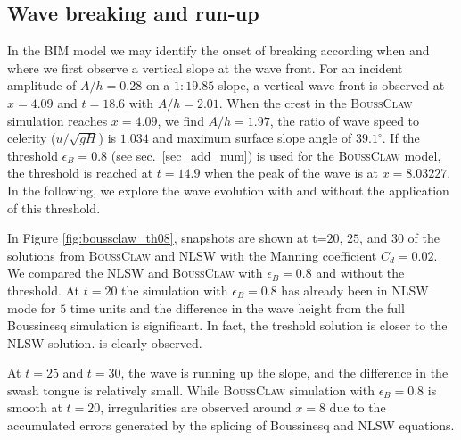 \documentclass[review]{elsarticle}
\newcommand{\BoussClaw}{\textsc{BoussClaw} }
\begin{document}
\subsection{Wave breaking and run-up}
In the BIM model we may identify the onset of breaking according when and where we first observe a vertical slope at the wave front.
For an incident amplitude of $A/h=0.28$ on a $1:19.85$ slope,
a vertical wave front is observed at $x=4.09$ and $t=18.6$ with $A/h=2.01$.
When the crest in the \BoussClaw simulation reaches $x=4.09$, 
we find
$A/h=1.97$, the ratio of wave speed to celerity ($u/\sqrt{gH}$)
is $1.034$ and maximum surface slope angle of $39.1^\circ$.
If the threshold $\epsilon_B=0.8$ (see sec.~\ref{sec_add_num})
is used for the \BoussClaw model,
the threshold is  reached at $t=14.9$
when the peak of the wave is at $x=8.03227$.
In the following, we explore the wave evolution with and without
the application of this threshold.

In Figure \ref{fig:boussclaw_th08}, snapshots are shown at 
t=$20$, $25$, and $30$ of the solutions from \BoussClaw and NLSW
with the Manning coefficient $C_d=0.02$.
We compared the NLSW and \BoussClaw with $\epsilon_B=0.8$
and without the threshold. 
At $t=20$ the simulation with $\epsilon_B=0.8$ has already been in NLSW mode for $5$ time units and the difference in the wave height 
from the full Boussinesq simulation is significant. In fact, the treshold solution is closer to the NLSW solution.
is clearly observed. 

At $t=25$ and $t=30$, the wave is running up the slope, 
and the difference in the swash tongue is relatively small. 
While \BoussClaw simulation with $\epsilon_B=0.8$ is
smooth at $t=20$, irregularities are observed
around $x=8$ due to the accumulated errors generated by the splicing of 
Boussinesq and NLSW equations. 
\end{document}
